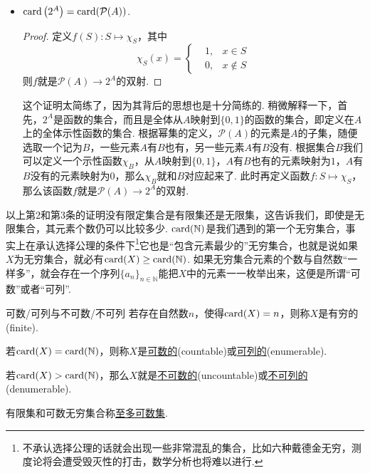 \begin{itemize}
    \item [(3)] \({\rm card}\left(2^A\right) = {\rm card}(\mathcal{P}(A))\).
    \begin{proof}
        定义\(f(S): S \mapsto \chi_S\)，其中
        \[
            \chi_S(x) = \left\{\begin{aligned} &1, &x \in S \\ &0, &x \not\in S \end{aligned}\right.
        \]
        则\(f\)就是\(\mathcal{P}(A) \to 2^A\)的双射.
    \end{proof}
    \begin{note}
        这个证明太简练了，因为其背后的思想也是十分简练的. 稍微解释一下，首先，\(2^A\)是函数的集合，而且是全体从\(A\)映射到\(\{0,1\}\)的函数的集合，即定义在\(A\)上的全体示性函数的集合. 根据幂集的定义，\(\mathcal{P}(A)\)的元素是\(A\)的子集，随便选取一个记为\(B\)，一些元素\(A\)有\(B\)也有，另一些元素\(A\)有\(B\)没有. 根据集合\(B\)我们可以定义一个示性函数\(\chi_B\)，从\(A\)映射到\(\{0,1\}\)，\(A\)有\(B\)也有的元素映射为\(1\)，\(A\)有\(B\)没有的元素映射为\(0\)，那么\(\chi_B\)就和\(B\)对应起来了. 此时再定义函数\(f: S \mapsto \chi_S\)，那么该函数\(f\)就是\(\mathcal{P}(A) \to 2^A\)的双射.
    \end{note}
\end{itemize}

以上第2和第3条的证明没有限定集合是有限集还是无限集，这告诉我们，即使是无限集合，其元素个数仍可以比较多少. \({\rm card}(\mathbb{N})\)是我们遇到的第一个无穷集合，事实上在承认选择公理的条件下\footnote{不承认选择公理的话就会出现一些非常混乱的集合，比如六种戴德金无穷，测度论将会遭受毁灭性的打击，数学分析也将难以进行.}它也是“包含元素最少的”无穷集合，也就是说如果\(X\)为无穷集合，就必有\({\rm card}(X)\geq{\rm card}(\mathbb{N})\). 如果无穷集合元素的个数与自然数“一样多”，就会存在一个序列\(\{a_n\}_{n\in\mathbb{N}}\)能把\(X\)中的元素一一枚举出来，这便是所谓“可数”或者“可列”.

\begin{definition}{可数/可列与不可数/不可列}
    若存在自然数\(n\)，使得\({\rm card}(X)=n\)，则称\(X\)是有穷的(finite).
    \par
    若\({\rm card}(X)={\rm card}(\mathbb{N})\)，则称\(X\)是\underline{可数的}(countable)或\underline{可列的}(enumerable). 
    \par
    若\({\rm card}(X)>{\rm card}(\mathbb{N})\)，那么\(X\)就是\underline{不可数的}(uncountable)或\underline{不可列的}(denumerable).
    \par
    有限集和可数无穷集合称\underline{至多可数集}.
\end{definition}

